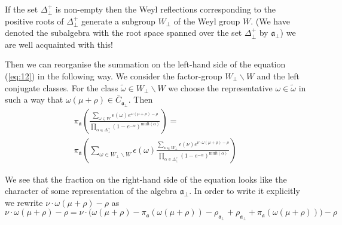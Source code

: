 \documentclass[a4paper,12pt]{article}
\theoremstyle{definition} \newtheorem{Def}{Definition}
\begin{document}
If the set $\Delta^{+}_{\bot}$ is non-empty then the Weyl reflections corresponding to the positive roots of $\Delta^{+}_{\bot}$ generate a subgroup $W_{\bot}$ of the Weyl group $W$.
{\color{red} (We have denoted the subalgebra with the root space spanned over the set $\Delta^{+}_{\bot}$ by $\mathfrak{a}_{\bot}$) we are well acquainted with this!}

Then we can reorganise the summation on the left-hand side of the equation (\ref{eq:12}) in the following way.
We consider the factor-group $W_{\bot}\backslash W$ and the left conjugate classes. For the class $\tilde{\omega}\in W_{\bot}\backslash W$ we choose the representative $\omega \in \tilde{\omega}$ in such a way that $\omega(\mu+\rho)\in \bar{C}_{\mathfrak{a}_{\bot}}$. Then
\begin{multline}
  \label{eq:13}
 \pi_{\mathfrak{a}}\left(\frac{\sum_{\omega\in W} \epsilon(\omega) e^{\omega(\mu+\rho)-\rho}}{\prod_{\alpha\in\Delta^{+}_{\bot}}(1-e^{-\alpha})^{\mathrm{mult}(\alpha)}}\right) = \\
 \pi_{\mathfrak{a}}\left(\sum_{\omega\in W_{\bot}\backslash W} \epsilon(\omega) \frac{\sum_{\nu\in W_{\bot}}\epsilon(\nu) e^{\nu \cdot \omega(\mu+\rho)-\rho}}{\prod_{\alpha\in\Delta^{+}_{\bot}}(1-e^{-\alpha})^{\mathrm{mult}(\alpha)}}\right)
\end{multline}

We see that the fraction on the right-hand side of the equation looks like the character of some representation of the algebra $\mathfrak{a}_{\bot}$.
In order to write it explicitly we rewrite $\nu\cdot\omega(\mu+\rho)-\rho$ as
\begin{equation}
  \label{eq:30}
  \nu\cdot\omega(\mu+\rho)-\rho=\nu\cdot \bigl(\omega(\mu+\rho)-\pi_{\mathfrak{a}}(\omega(\mu+\rho))-\rho_{\mathfrak{a}_{\bot}}+\rho_{\mathfrak{a}_{\bot}}+\pi_{\mathfrak{a}}(\omega(\mu+\rho))\bigr)-\rho
\end{equation}
\end{document}
